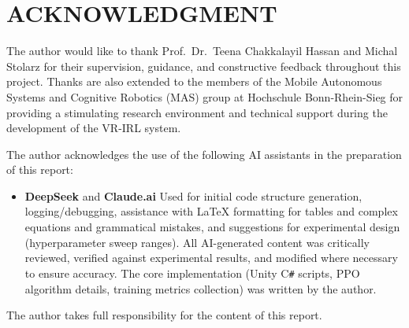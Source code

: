 \documentclass[../report.tex]{subfiles}
\begin{document}
    \section*{ACKNOWLEDGMENT}

    The author would like to thank Prof.\ Dr.\ Teena Chakkalayil Hassan and Michal Stolarz for their supervision, guidance, and constructive feedback throughout this project. Thanks are also extended to the members of the Mobile Autonomous Systems and Cognitive Robotics (MAS) group at Hochschule Bonn-Rhein-Sieg for providing a stimulating research environment and technical support during the development of the VR-IRL system.

    The author acknowledges the use of the following AI assistants in the preparation of this report: 
    \begin{itemize}
        \item \textbf{DeepSeek} and \textbf{Claude.ai} Used for initial code structure generation, logging/debugging, assistance with LaTeX formatting for tables and complex equations and grammatical mistakes, and suggestions for experimental design (hyperparameter sweep ranges). All AI-generated content was critically reviewed, verified against experimental results, and modified where necessary to ensure accuracy. The core implementation (Unity C\texttt{\#} scripts, PPO algorithm details, training metrics collection) was written by the author.
    \end{itemize}

    The author takes full responsibility for the content of this report.
\end{document}
